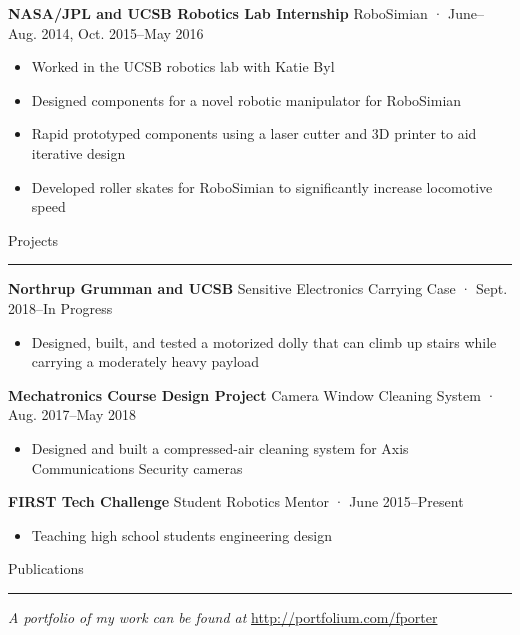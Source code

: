 \documentclass[12pt, oneside]{article}
\newcommand{\headingstyleJobs}[1] {
	{\fontsize{19pt}{1em}\selectfont \textcolor{new_red}{\textsf{#1}}}
	\textcolor{new_red}{\rule{3.25in}{0.5pt}} \vspace{3pt}
}
\newcommand{\jobtitle}[3] {
	{\bf #1} {#2} · {#3} \vspace{-10pt} \\
}
\begin{document}
\begin{flushleft}
\jobtitle{NASA/JPL and UCSB Robotics Lab Internship}{RoboSimian}{June–Aug. 2014, Oct. 2015–May 2016}
\begin{itemize}
	\item Worked in the UCSB robotics lab with Katie Byl
	\item Designed components for a novel robotic manipulator for RoboSimian
	\item Rapid prototyped components using a laser cutter and 3D printer to aid iterative design
	\item Developed roller skates for RoboSimian to significantly increase locomotive speed 
\end{itemize}


\headingstyleJobs{Projects}

\jobtitle{Northrup Grumman and UCSB}{Sensitive Electronics Carrying Case}{Sept. 2018–In Progress}
\begin{itemize}
	\item Designed, built, and tested a motorized dolly that can climb up stairs while carrying a moderately heavy payload
\end{itemize}

\jobtitle{Mechatronics Course Design Project}{Camera Window Cleaning System}{Aug. 2017–May 2018}
\begin{itemize}
	\item Designed and built a compressed-air cleaning system for Axis Communications Security cameras 
\end{itemize}

\jobtitle{FIRST Tech Challenge}{Student Robotics Mentor}{June 2015–Present}
\begin{itemize}
	\item Teaching high school students engineering design
\end{itemize}




\headingstyleJobs{Publications}

\vspace{-9pt}
\nocite{OWMS-DSA}




\textit{A portfolio of my work can be found at} \url{http://portfolium.com/fporter}

\end{flushleft}
\end{document}

